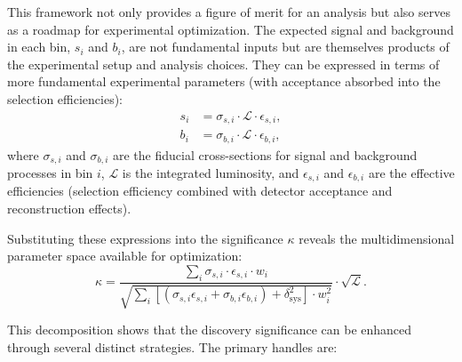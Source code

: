 This framework not only provides a figure of merit for an analysis but also serves as a roadmap for experimental optimization. The expected signal and background in each bin, $s_i$ and $b_i$, are not fundamental inputs but are themselves products of the experimental setup and analysis choices. They can be expressed in terms of more fundamental experimental parameters (with acceptance absorbed into the selection efficiencies):
\begin{align*}
    s_i &= \sigma_{s,i} \cdot \mathcal{L} \cdot \epsilon_{s,i}, \\
    b_i &= \sigma_{b,i} \cdot \mathcal{L} \cdot \epsilon_{b,i},
\end{align*}
where $\sigma_{s,i}$ and $\sigma_{b,i}$ are the fiducial cross-sections for signal and background processes in bin $i$, $\mathcal{L}$ is the integrated luminosity, and $\epsilon_{s,i}$ and $\epsilon_{b,i}$ are the effective efficiencies (selection efficiency combined with detector acceptance and reconstruction effects).

Substituting these expressions into the significance $\kappa$ reveals the multidimensional parameter space available for optimization:
\[
\kappa = \frac{\sum_i \sigma_{s,i} \cdot \epsilon_{s,i} \cdot w_i}
{\sqrt{\sum_i \left[ (\sigma_{s,i}\epsilon_{s,i} + \sigma_{b,i}\epsilon_{b,i}) + \delta^2_{\text{sys}} \right] \cdot w_i^2}} \cdot \sqrt{\mathcal{L}}.
\]

This decomposition shows that the discovery significance can be enhanced through several distinct strategies. The primary handles are:

